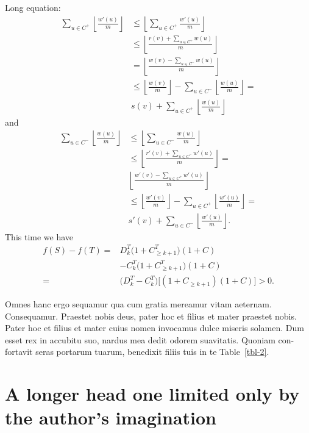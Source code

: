 \documentclass{nejsds}
\theoremstyle{remark}
\begin{document}
Long equation:
%
\begin{align}
\sum_{u\in C^+}\left\lfloor{\frac{w'(u)}{m}} \right\rfloor 
    & \le \left\lfloor\sum_{u\in C^+} {\frac{w'(u)}{m}} \right\rfloor \nonumber \\
    & \le \left\lfloor{\frac{r(v)+\sum_{u\in C^+} w(u)}{m}} \right \rfloor \\
    & = \left\lfloor{\frac{w(v)-\sum_{u\in C^-} w(u)}{m}} \right \rfloor \nonumber \\
    & \le \left\lfloor{\frac{w(v)}{m}} \right\rfloor -\sum_{u\in C^-}\left\lfloor{\frac{w(u)}{m}} \right\rfloor = \\
    & s(v)+\sum_{u\in C^+}\left\lfloor{\frac{w(u)}{m}} \right\rfloor
\end{align}
%
and
%
\begin{align}
\sum_{u\in C^-}\left\lfloor{\frac{w(u)}{m}} \right\rfloor
    & \le \left\lfloor\sum_{u\in C^-} {\frac{w(u)}{m}} \right\rfloor \nonumber \\
    & \le \left\lfloor{\frac{r'(v)+\sum_{u\in C^-} w'(u)}{m}} \right \rfloor = \\
    & \left\lfloor{\frac{w'(v)-\sum_{u\in C^+} w'(u)}{m}} \right\rfloor \nonumber\\
    & \le \left\lfloor{\frac{w'(v)}{m}} \right\rfloor -\sum_{u\in C^+}\left\lfloor{\frac{w'(u)}{m}} \right\rfloor = \\
    & s'(v)+\sum _{u\in C^-}\left\lfloor{\frac{w'(u)}{m}} \right\rfloor .
\end{align}
%
This time we have
%
\begin{align}
f(S)-f(T) = {} & D_k^T\bigl(1+C_{\geq k+1}^T\bigr)(1 + C) \nonumber    \\
            {} & - C_k^T\bigl(1+C_{\geq k+1}^T\bigr)(1 + C)  \nonumber \\
          = {} & \bigl(D_k^T-C_k^T\bigr)\bigl[(1+C_{\geq k+1})(1+C)\bigr]>0.
\end{align}

Omnes hanc ergo sequamur qua cum gratia mereamur vitam aeternam.
Consequamur. Praestet nobis deus, pater hoc et filius et mater
praestet nobis.  Pater hoc et filius et mater cuius nomen invocamus
dulce miseris solamen. Dum esset rex in accubitu suo, nardus mea
dedit odorem suavitatis. Quoniam con-fortavit seras portarum tuarum,
benedixit filiis tuis in te Table~\ref{tbl-2}.



\section{A longer head one limited only by the author's imagination}
\end{document}
